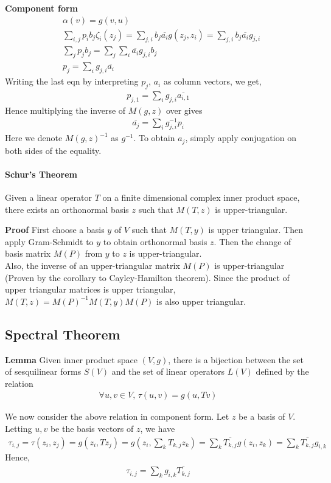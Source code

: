 \documentclass{article}
\begin{document}
\textbf{Component form}
\begin{align*}
	&\alpha(v) = g(v,u)\\
	&\sum_{i,j}p_ib_j\zeta_i(z_j)=\sum_{j,i}b_j\overline{a_i}g(z_j,z_i)=\sum_{j,i}b_j\overline{a_i}g_{j,i}\\
	&\sum_j p_jb_j = \sum_j\sum_i \overline{a_i}g_{j,i} b_j\\
	&p_j = \sum_i g_{j,i}\overline{a_i}
\end{align*}
Writing the last eqn by interpreting $p_j$, $a_i$ as column vectors, we get,
\begin{align*}
	p_{j,1} = \sum_i g_{j,i}\overline{a_{i,1}}
\end{align*}
Hence multiplying the inverse of $M(g,z)$ over gives
\begin{align*}
	\overline{a_j}=\sum_i g^{-1}_{j,i}p_i
\end{align*}
Here we denote $M(g,z)^{-1}$ as $g^{-1}$. To obtain $a_j$, simply apply conjugation on both sides of the equality.
\paragraph{Schur's Theorem}
Given a linear operator $T$ on a finite dimensional complex inner product space, there exists an orthonormal basis $z$ such that $M(T,z)$ is upper-triangular.

\textbf{Proof} First choose a basis $y$ of $V$ such that $M(T,y)$ is upper triangular. Then apply Gram-Schmidt to $y$ to obtain orthonormal basis $z$. Then the change of basis matrix $M(P)$ from $y$ to $z$ is upper-triangular. \\
Also, the inverse of an upper-triangular matrix $M(P)$ is upper-triangular (Proven by the corollary to Cayley-Hamilton theorem). Since the product of upper triangular matrices is upper triangular, $M(T,z) = M(P)^{-1}M(T,y)M(P)$ is also upper triangular.

\subsection{Spectral Theorem}
\textbf{Lemma} Given inner product space $(V,g)$, there is a bijection between the set of sesquilinear forms $S(V)$ and the set of linear operators $L(V)$ defined by the relation
\begin{align*}
	\forall u,v \in V,\, \tau(u,v) = g(u,Tv) 
\end{align*}

We now consider the above relation in component form. Let $z$ be a basis of $V$. Letting $u,v$ be the basis vectors of $z$, we have
\begin{align*}
	\tau_{i,j} = \tau(z_i,z_j) = g(z_i,Tz_j) = g(z_i,\sum_k T_{k,j}z_k) = \sum_k \overline{T_{k,j}}g(z_i, z_k)=\sum_k \overline{T_{k,j}}g_{i,k}
\end{align*}
Hence, 
\begin{align*}
	\tau_{i,j} = \sum_k g_{i,k}\overline{T_{k,j}}
\end{align*}
\end{document}
